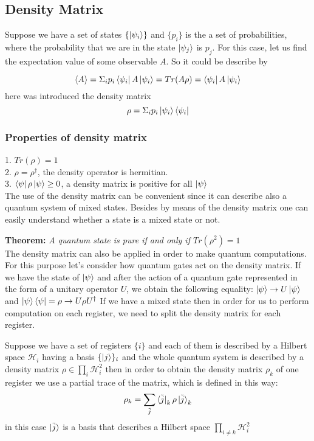 \documentclass[english,14pt,a4paper]{article}
\begin{document}
	\subsection{Density Matrix}
	Suppose we have a set of states $\{\ket{\psi_i}\}$ and $\{p_i\}$ is the a set of probabilities, where the probability that we are in the state $\ket{\psi_j}$ is $p_j$. For this case, let us find the expectation value of some observable $A$. So it could be describe by 
	
	\[
	\left\langle A \right\rangle = \Sigma_i p_i \bra{\psi _i} A \ket{\psi_i} = Tr(A \rho) = \bra{\psi_i} A \ket{\psi_i}
	\]
	here was introduced the density matrix 
	\[
	\rho = \Sigma_i p_i \ket{\psi_i} \bra{\psi_i}
	\]
	
	\subsubsection*{Properties of density matrix} 
	1. $Tr(\rho) = 1$ \\
	2. $\rho = \rho^{\dag}$, the density operator is hermitian.  \\
	3. $\bra{\psi}\rho\ket{\psi} \geq 0  $, a density matrix is positive for all $\ket{\psi}$ \\
	The use of the density matrix can be convenient since it can describe also a quantum system of mixed states. Besides by means of the density matrix one can easily understand whether a state is a mixed state or not. 
	
	\textbf{Theorem:} \textit{A quantum state is pure if and only if $Tr(\rho^2) = 1$} \\
	
	The density matrix can also be applied in order to make quantum computations. For this purpose let's consider how quantum gates act on the density matrix. If we have the state of $\ket{\psi}$ and after the action of a quantum gate represented in the form of a unitary operator $U$, we obtain the following equality: $\ket{\psi} \rightarrow U\ket{\psi}$ and $\ket{\psi}\bra{\psi} = \rho \rightarrow U\rho U^{\dag}$
	If we have a mixed state then in order for us to perform computation on each register, we need to split the density matrix for each register. 	
	
	Suppose we have a set of registers $\{i\}$ and each of them is described by a Hilbert space $\mathcal{H}_i$ having a basis $\{\ket{j}\}_i$ and the whole quantum system is described by a density matrix $\rho  \in \prod_i \mathcal{H}_i^2$ then in order to obtain the density matrix $\rho_k$ of one register we use a partial trace of the matrix, which is defined in this way:	\[
	\rho_k = \sum_{\tilde{j}} \bra{\tilde{j}}_k \rho \ket{\tilde{j}}_k
	\]  
	in this case $\ket{\tilde{j}}$ is a basis that describes a Hilbert space $\prod_{i \neq k} \mathcal{H}_i^2 $ 
	
\end{document}
